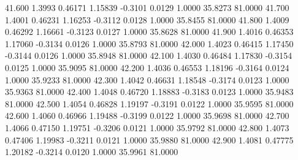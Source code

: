  41.600   1.3993   0.46171   1.15839  -0.3101   0.0129   1.0000  35.8273  81.0000
  41.700   1.4001   0.46231   1.16253  -0.3112   0.0128   1.0000  35.8455  81.0000
  41.800   1.4009   0.46292   1.16661  -0.3123   0.0127   1.0000  35.8628  81.0000
  41.900   1.4016   0.46353   1.17060  -0.3134   0.0126   1.0000  35.8793  81.0000
  42.000   1.4023   0.46415   1.17450  -0.3144   0.0126   1.0000  35.8948  81.0000
  42.100   1.4030   0.46484   1.17830  -0.3154   0.0125   1.0000  35.9095  81.0000
  42.200   1.4036   0.46553   1.18196  -0.3164   0.0124   1.0000  35.9233  81.0000
  42.300   1.4042   0.46631   1.18548  -0.3174   0.0123   1.0000  35.9363  81.0000
  42.400   1.4048   0.46720   1.18883  -0.3183   0.0123   1.0000  35.9483  81.0000
  42.500   1.4054   0.46828   1.19197  -0.3191   0.0122   1.0000  35.9595  81.0000
  42.600   1.4060   0.46966   1.19488  -0.3199   0.0122   1.0000  35.9698  81.0000
  42.700   1.4066   0.47150   1.19751  -0.3206   0.0121   1.0000  35.9792  81.0000
  42.800   1.4073   0.47406   1.19983  -0.3211   0.0121   1.0000  35.9880  81.0000
  42.900   1.4081   0.47775   1.20182  -0.3214   0.0120   1.0000  35.9961  81.0000
